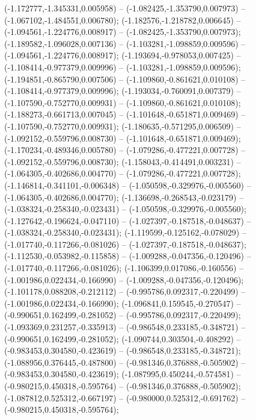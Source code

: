  (-1.172777,-1.345331,0.005958) -- (-1.082425,-1.353790,0.007973) -- (-1.067102,-1.484551,0.006780);
 (-1.182576,-1.218782,0.006645) -- (-1.094561,-1.224776,0.008917) -- (-1.082425,-1.353790,0.007973);
 (-1.189582,-1.096028,0.007136) -- (-1.103281,-1.098859,0.009596) -- (-1.094561,-1.224776,0.008917);
 (-1.193694,-0.978053,0.007425) -- (-1.108414,-0.977379,0.009996) -- (-1.103281,-1.098859,0.009596);
 (-1.194851,-0.865790,0.007506) -- (-1.109860,-0.861621,0.010108) -- (-1.108414,-0.977379,0.009996);
 (-1.193034,-0.760091,0.007379) -- (-1.107590,-0.752770,0.009931) -- (-1.109860,-0.861621,0.010108);
 (-1.188273,-0.661713,0.007045) -- (-1.101648,-0.651871,0.009469) -- (-1.107590,-0.752770,0.009931);
 (-1.180635,-0.571295,0.006509) -- (-1.092152,-0.559796,0.008730) -- (-1.101648,-0.651871,0.009469);
 (-1.170234,-0.489346,0.005780) -- (-1.079286,-0.477221,0.007728) -- (-1.092152,-0.559796,0.008730);
 (-1.158043,-0.414491,0.003231) -- (-1.064305,-0.402686,0.004770) -- (-1.079286,-0.477221,0.007728);
 (-1.146814,-0.341101,-0.006348) -- (-1.050598,-0.329976,-0.005560) -- (-1.064305,-0.402686,0.004770);
 (-1.136698,-0.268543,-0.023179) -- (-1.038324,-0.258340,-0.023431) -- (-1.050598,-0.329976,-0.005560);
 (-1.127642,-0.196624,-0.047110) -- (-1.027397,-0.187518,-0.048637) -- (-1.038324,-0.258340,-0.023431);
 (-1.119599,-0.125162,-0.078029) -- (-1.017740,-0.117266,-0.081026) -- (-1.027397,-0.187518,-0.048637);
 (-1.112530,-0.053982,-0.115858) -- (-1.009288,-0.047356,-0.120496) -- (-1.017740,-0.117266,-0.081026);
 (-1.106399,0.017086,-0.160556) -- (-1.001986,0.022434,-0.166990) -- (-1.009288,-0.047356,-0.120496);
 (-1.101178,0.088208,-0.212112) -- (-0.995786,0.092317,-0.220499) -- (-1.001986,0.022434,-0.166990);
 (-1.096841,0.159545,-0.270547) -- (-0.990651,0.162499,-0.281052) -- (-0.995786,0.092317,-0.220499);
 (-1.093369,0.231257,-0.335913) -- (-0.986548,0.233185,-0.348721) -- (-0.990651,0.162499,-0.281052);
 (-1.090744,0.303504,-0.408292) -- (-0.983453,0.304580,-0.423619) -- (-0.986548,0.233185,-0.348721);
 (-1.088956,0.376445,-0.487800) -- (-0.981346,0.376888,-0.505902) -- (-0.983453,0.304580,-0.423619);
 (-1.087995,0.450244,-0.574581) -- (-0.980215,0.450318,-0.595764) -- (-0.981346,0.376888,-0.505902);
 (-1.087812,0.525312,-0.667197) -- (-0.980000,0.525312,-0.691762) -- (-0.980215,0.450318,-0.595764);
